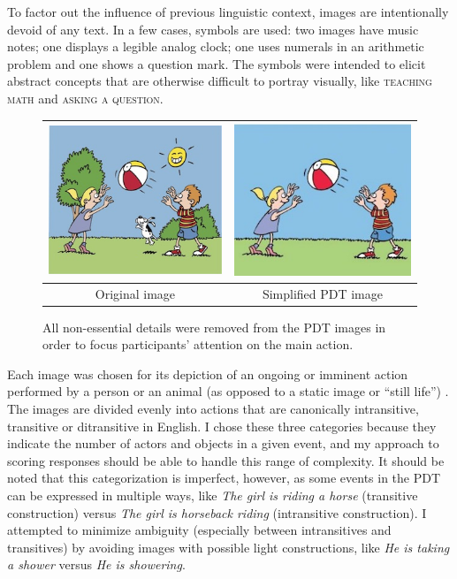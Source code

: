 To factor out the influence of previous linguistic context, images are intentionally devoid of any text. In a few cases, symbols are used: two images have music notes; one displays a legible analog clock; one uses numerals in an arithmetic problem and one shows a question mark. The symbols were intended to elicit abstract concepts that are otherwise difficult to portray visually, like \textsc{teaching math} and \textsc{asking a question}. 

\begin{figure}[htb!]
\begin{center}
\begin{tabular}{|c|c|}
\hline
{\includegraphics[width=0.38\columnwidth]{figures/throw-original.jpg}} & {\includegraphics[width=0.38\columnwidth]{figures/I21cropped.jpg}} \\
\hline
Original image & Simplified PDT image \\
\hline
\end{tabular}
\caption{\label{fig:image-prep} All non-essential details were removed from the PDT images in order to focus participants' attention on the main action.}
\end{center}
\end{figure}

Each image was chosen for its depiction of an ongoing or imminent action performed by a person or an animal (as opposed to a static image or ``still life'') . The images are divided evenly into actions that are canonically intransitive, transitive or ditransitive in English. I chose these three categories because they indicate the number of actors and objects in a given event, and my approach to scoring responses should be able to handle this range of complexity. It should be noted that this categorization is imperfect, however, as some events in the PDT can be expressed in multiple ways, like \textit{The girl is riding a horse} (transitive construction) versus \textit{The girl is horseback riding} (intransitive construction). I attempted to minimize ambiguity (especially between intransitives and transitives) by avoiding images with possible light constructions, like \textit{He is taking a shower} versus \textit{He is showering}.


